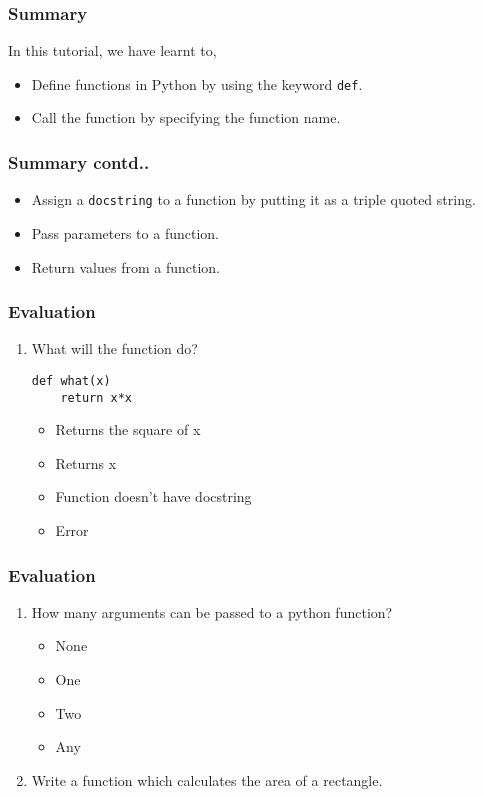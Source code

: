 \documentclass[17pt,compress]{beamer}
\newcounter{saveenumi}
\newcommand{\seti}{\setcounter{saveenumi}{\value{enumi}}}
\newcommand{\conti}{\setcounter{enumi}{\value{saveenumi}}}
\begin{document}
\begin{frame}
\frametitle{Summary}
\label{sec-16.1}

 In this tutorial, we have learnt to,

\begin{itemize}
\item Define functions in Python by using the keyword \texttt{def}.
\item Call the function by specifying the function name.
\end{itemize}
\end{frame}
\begin{frame}
\frametitle{Summary contd..}
\label{sec-16.2}

\begin{itemize}
\item Assign a \texttt{docstring} to a function by putting it as a triple quoted string.
\item Pass parameters to a function.
\item Return values from a function.
\end{itemize}
\end{frame}
\begin{frame}[fragile]
\frametitle{Evaluation}
\label{sec-17.1}

\begin{enumerate}
\item What will the function do?
\lstset{language=Python}
\begin{lstlisting}
def what(x)
    return x*x
\end{lstlisting}\pause
\begin{itemize}
\item Returns the square of x
\item Returns x
\item Function doesn't have docstring
\item Error
\end{itemize}
\seti
\end{enumerate}
\end{frame}
\begin{frame}[fragile]
\frametitle{Evaluation}
\label{sec-17.2}

\begin{enumerate}
\conti
\item How many arguments can be passed to a python function?
\begin{itemize}\pause
\item None
\item One
\item Two
\item Any
\end{itemize}\pause
\item Write a function which calculates the area of a rectangle.
\end{enumerate}
\end{frame}
\end{document}
